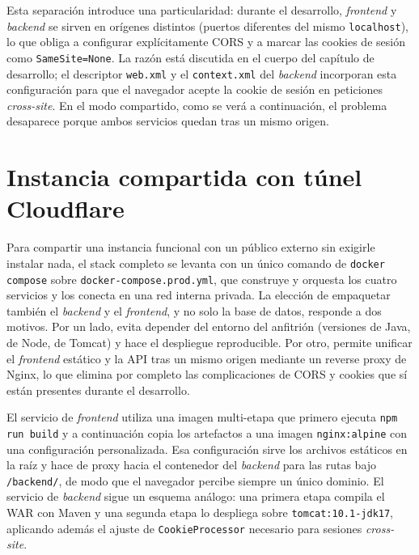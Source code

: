 Esta separación introduce una particularidad: durante el desarrollo,
\textit{frontend} y \textit{backend} se sirven en orígenes distintos (puertos diferentes
del mismo \texttt{localhost}), lo que obliga a configurar
explícitamente CORS y a marcar las cookies de sesión como
\texttt{SameSite=None}. La razón está discutida en el cuerpo del
capítulo de desarrollo; el descriptor \texttt{web.xml} y el
\texttt{context.xml} del \textit{backend} incorporan esta configuración para
que el navegador acepte la cookie de sesión en peticiones
\emph{cross-site}. En el modo compartido, como se verá a continuación,
el problema desaparece porque ambos servicios quedan tras un mismo
origen.

\section{Instancia compartida con túnel Cloudflare}

Para compartir una instancia funcional con un público externo sin
exigirle instalar nada, el stack completo se levanta con un único
comando de \texttt{docker compose} sobre \texttt{docker-compose.prod.yml},
que construye y orquesta los cuatro servicios y los conecta en una red
interna privada. La elección de empaquetar también el \textit{backend} y el
\textit{frontend}, y no solo la base de datos, responde a dos motivos. Por un
lado, evita depender del entorno del anfitrión (versiones de Java, de
Node, de Tomcat) y hace el despliegue reproducible. Por otro, permite
unificar el \textit{frontend} estático y la API tras un mismo origen mediante un
reverse proxy de Nginx, lo que elimina por completo las complicaciones
de CORS y cookies que sí están presentes durante el desarrollo.

El servicio de \textit{frontend} utiliza una imagen multi-etapa que primero
ejecuta \texttt{npm run build} y a continuación copia los artefactos a
una imagen \texttt{nginx:alpine} con una configuración personalizada.
Esa configuración sirve los archivos estáticos en la raíz y hace de
proxy hacia el contenedor del \textit{backend} para las rutas bajo
\texttt{/backend/}, de modo que el navegador percibe siempre un único
dominio. El servicio de \textit{backend} sigue un esquema análogo: una primera
etapa compila el WAR con Maven y una segunda etapa lo despliega sobre
\texttt{tomcat:10.1-jdk17}, aplicando además el ajuste de
\texttt{CookieProcessor} necesario para sesiones \emph{cross-site}.


